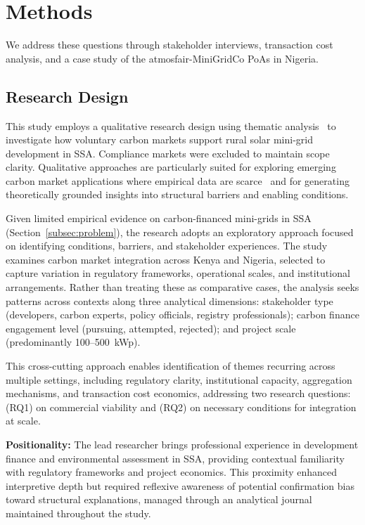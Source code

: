 \section{Methods}
\label{sec:methods}
We address these questions through stakeholder interviews, transaction cost analysis, and a case study of the atmosfair-MiniGridCo PoAs in Nigeria.

\subsection{Research Design}
\label{subsec:design}
This study employs a qualitative research design using thematic analysis~\cite{BraunClarke} to investigate how voluntary carbon markets support rural solar mini-grid development in SSA. Compliance markets were excluded to maintain scope clarity. Qualitative approaches are particularly suited for exploring emerging carbon market applications where empirical data are scarce~\cite{CreswellPoth} and for generating theoretically grounded insights into structural barriers and enabling conditions.~\cite{Flyvbjerg}

Given limited empirical evidence on carbon-financed mini-grids in SSA (Section~\ref{subsec:problem}), the research adopts an exploratory approach focused on identifying conditions, barriers, and stakeholder experiences. The study examines carbon market integration across Kenya and Nigeria, selected to capture variation in regulatory frameworks, operational scales, and institutional arrangements. Rather than treating these as comparative cases, the analysis seeks patterns across contexts along three analytical dimensions: stakeholder type (developers, carbon experts, policy officials, registry professionals); carbon finance engagement level (pursuing, attempted, rejected); and project scale (predominantly 100--500~kWp).

This cross-cutting approach enables identification of themes recurring across multiple settings, including regulatory clarity, institutional capacity, aggregation mechanisms, and transaction cost economics, addressing two research questions: (RQ1) on commercial viability and (RQ2) on necessary conditions for integration at scale.

\textbf{Positionality:} The lead researcher brings professional experience in development finance and environmental assessment in SSA, providing contextual familiarity with regulatory frameworks and project economics. This proximity enhanced interpretive depth but required reflexive awareness of potential confirmation bias toward structural explanations, managed through an analytical journal maintained throughout the study.

